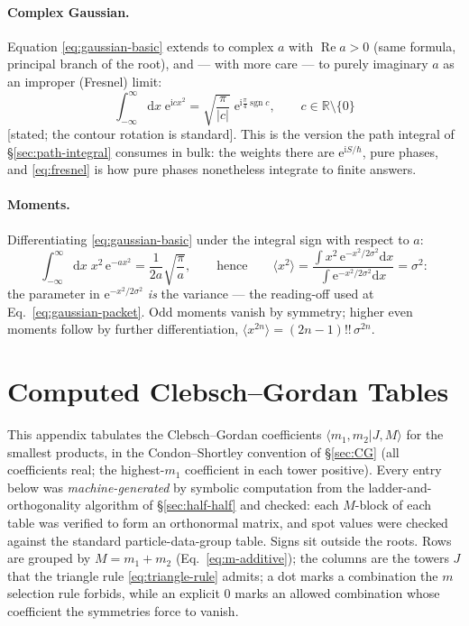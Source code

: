 \documentclass[11pt]{article}
\theoremstyle{plain}
\theoremstyle{definition}
\theoremstyle{remark}
\newcommand{\dd}{\mathrm{d}}
\newcommand{\ee}{\mathrm{e}}
\newcommand{\ii}{\mathrm{i}}
\newcommand{\R}{\mathbb{R}}
\newcommand{\braket}[2]{\langle #1 | #2 \rangle}
\begin{document}
\paragraph{Complex Gaussian.} Equation \eqref{eq:gaussian-basic}
extends to complex $a$ with $\operatorname{Re} a > 0$ (same formula,
principal branch of the root), and --- with more care --- to purely
imaginary $a$ as an improper (Fresnel) limit:
\begin{equation}
  \int_{-\infty}^{\infty}\dd x\;\ee^{\ii c x^2}
  = \sqrt{\frac{\pi}{|c|}}\;\ee^{\ii\frac\pi4\operatorname{sgn} c},
  \qquad c \in \R\setminus\{0\}
  \label{eq:fresnel}
\end{equation}
[stated; the contour rotation is standard]. This is the version the
path integral of \S\ref{sec:path-integral} consumes in bulk: the
weights there are $\ee^{\ii S/\hbar}$, pure phases, and
\eqref{eq:fresnel} is how pure phases nonetheless integrate to
finite answers.

\paragraph{Moments.} Differentiating \eqref{eq:gaussian-basic} under
the integral sign with respect to $a$:
\begin{equation}
  \int_{-\infty}^{\infty}\dd x\; x^2\,\ee^{-a x^2}
  = \frac{1}{2a}\sqrt{\frac{\pi}{a}},
  \qquad\text{hence}\qquad
  \langle x^2\rangle
  = \frac{\int x^2\,\ee^{-x^2/2\sigma^2}\dd x}
         {\int \ee^{-x^2/2\sigma^2}\dd x}
  = \sigma^2 :
  \label{eq:gaussian-variance}
\end{equation}
the parameter in $\ee^{-x^2/2\sigma^2}$ \emph{is} the variance ---
the reading-off used at Eq.~\eqref{eq:gaussian-packet}. Odd moments
vanish by symmetry; higher even moments follow by further
differentiation, $\langle x^{2n}\rangle = (2n-1)!!\,\sigma^{2n}$.

\section{Computed Clebsch--Gordan Tables}
\label{app:cg-tables}

This appendix tabulates the Clebsch--Gordan coefficients
$\braket{m_1, m_2}{J, M}$ for the smallest products, in the
Condon--Shortley convention of \S\ref{sec:CG} (all coefficients
real; the highest-$m_1$ coefficient in each tower positive). Every
entry below was \emph{machine-generated} by symbolic computation
from the ladder-and-orthogonality algorithm of
\S\ref{sec:half-half} and checked: each $M$-block of each table was
verified to form an orthonormal matrix, and spot values were
checked against the standard particle-data-group table. Signs sit
outside the roots. Rows are grouped by $M = m_1 + m_2$
(Eq.~\eqref{eq:m-additive}); the columns are the towers $J$ that
the triangle rule \eqref{eq:triangle-rule} admits; a dot marks a
combination the $m$ selection rule forbids, while an explicit $0$
marks an allowed combination whose coefficient the symmetries force
to vanish.
\end{document}
